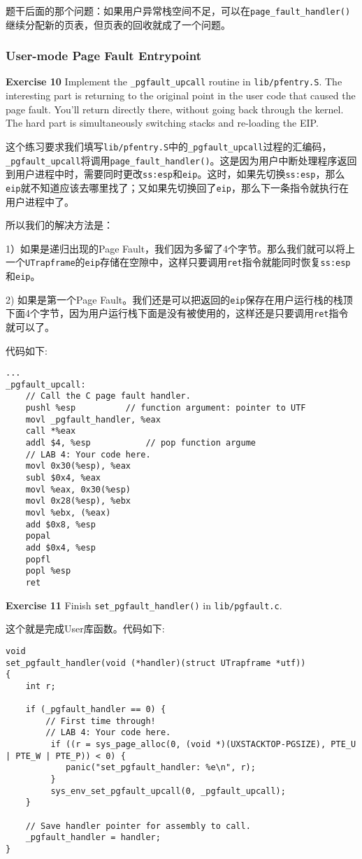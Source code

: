 \documentclass[11pt]{article}
\begin{document}
题干后面的那个问题：如果用户异常栈空间不足，可以在\lstinline|page_fault_handler()|继续分配新的页表，但页表的回收就成了一个问题。

\subsubsection{User-mode Page Fault Entrypoint}
\begin{framed}
\noindent\textbf{Exercise 10} Implement the \lstinline|_pgfault_upcall| routine in \lstinline|lib/pfentry.S|. The interesting part is returning to the original point in the user code that caused the page fault. You'll return directly there, without going back through the kernel. The hard part is simultaneously switching stacks and re-loading the EIP.
\end{framed}

这个练习要求我们填写\lstinline|lib/pfentry.S|中的\lstinline|_pgfault_upcall|过程的汇编码，\lstinline|_pgfault_upcall|将调用\lstinline|page_fault_handler()|。这是因为用户中断处理程序返回到用户进程中时，需要同时更改\lstinline|ss:esp|和\lstinline|eip|。这时，如果先切换\lstinline|ss:esp|，那么\lstinline|eip|就不知道应该去哪里找了；又如果先切换回了\lstinline|eip|，那么下一条指令就执行在用户进程中了。

所以我们的解决方法是：

1）如果是递归出现的Page Fault，我们因为多留了4个字节。那么我们就可以将上一个\lstinline|UTrapframe|的\lstinline|eip|存储在空隙中，这样只要调用\lstinline|ret|指令就能同时恢复\lstinline|ss:esp|和\lstinline|eip|。

2) 如果是第一个Page Fault。我们还是可以把返回的\lstinline|eip|保存在用户运行栈的栈顶下面4个字节，因为用户运行栈下面是没有被使用的，这样还是只要调用\lstinline|ret|指令就可以了。

代码如下:
\begin{lstlisting}[title=lib/pfentry.S]
...
_pgfault_upcall:
	// Call the C page fault handler.
	pushl %esp			// function argument: pointer to UTF
	movl _pgfault_handler, %eax
	call *%eax
	addl $4, %esp			// pop function argume
	// LAB 4: Your code here.
	movl 0x30(%esp), %eax
	subl $0x4, %eax
	movl %eax, 0x30(%esp)
	movl 0x28(%esp), %ebx
	movl %ebx, (%eax)
	add $0x8, %esp
	popal
	add $0x4, %esp
	popfl
	popl %esp
	ret
\end{lstlisting}

\begin{framed}
\noindent\textbf{Exercise 11} Finish \lstinline|set_pgfault_handler()| in \lstinline|lib/pgfault.c|.
\end{framed}
这个就是完成User库函数。代码如下:
\begin{lstlisting}
void
set_pgfault_handler(void (*handler)(struct UTrapframe *utf))
{
	int r;

	if (_pgfault_handler == 0) {
		// First time through!
		// LAB 4: Your code here.
		 if ((r = sys_page_alloc(0, (void *)(UXSTACKTOP-PGSIZE), PTE_U | PTE_W | PTE_P)) < 0) {
		 	panic("set_pgfault_handler: %e\n", r);
		 }
		 sys_env_set_pgfault_upcall(0, _pgfault_upcall);
	}

	// Save handler pointer for assembly to call.
	_pgfault_handler = handler;
}
\end{lstlisting}
\end{document}
